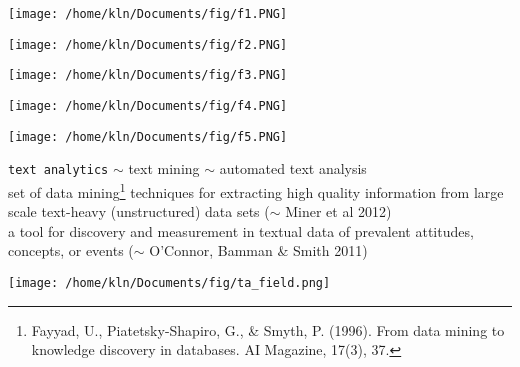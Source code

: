 \documentclass[8pt]{beamer}
\begin{document}
\begin{frame}
	\begin{center}
		\texttt{[image: /home/kln/Documents/fig/f1.PNG]}
	\end{center}
\end{frame}
\begin{frame}
	\begin{center}
		\texttt{[image: /home/kln/Documents/fig/f2.PNG]}
	\end{center}
\end{frame}
\begin{frame}
	\begin{center}
		\texttt{[image: /home/kln/Documents/fig/f3.PNG]}
	\end{center}
\end{frame}
\begin{frame}
	\begin{center}
		\texttt{[image: /home/kln/Documents/fig/f4.PNG]}
	\end{center}
\end{frame}
\begin{frame}
	\begin{center}
		\texttt{[image: /home/kln/Documents/fig/f5.PNG]}
	\end{center}
\end{frame}

\begin{frame}{}
\texttt{text analytics} $\sim$ text mining $\sim$ automated text analysis\\

\bigskip
set of data mining\footnote{Fayyad, U., Piatetsky-Shapiro, G., \& Smyth, P. (1996). From data mining to knowledge discovery in databases. AI Magazine, 17(3), 37.} techniques for extracting high quality information from \colorbox{red!30}{large scale text-heavy} (unstructured) data sets \flushright ($\sim$ Miner et al 2012)\\

\medskip
a tool for discovery and measurement in textual data of \colorbox{red!30}{prevalent attitudes, concepts, or events} \flushright($\sim$ O'Connor, Bamman \& Smith 2011)
\end{frame}

\begin{frame}
	\begin{center}
		\texttt{[image: /home/kln/Documents/fig/ta\_field.png]}
	\end{center}
\end{frame}
\end{document}
